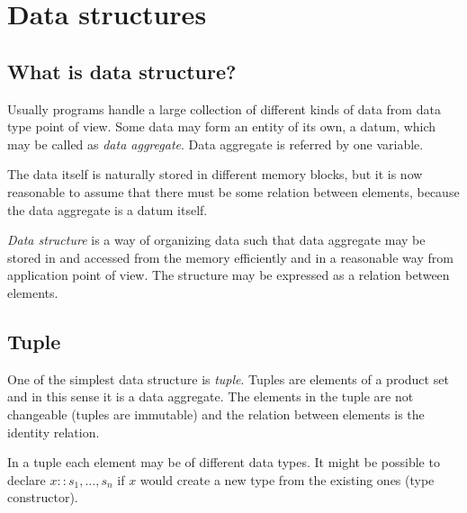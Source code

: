 \section{Data structures}
\subsection{What is data structure?}
Usually programs handle a large collection of different kinds of data from data type point of view. Some data may form an entity of its own, a datum, which may be called as \emph{data aggregate}. Data aggregate is referred by one variable.\par 
The data itself is naturally stored in different memory blocks, but it is now reasonable to assume that there must be some relation between elements, because the data aggregate is a datum itself.\par 
\emph{Data structure} is a way of organizing data such that data aggregate may be stored in and accessed from the memory efficiently and in a reasonable way from application point of view. The structure may be expressed as a relation between elements.
\subsection{Tuple} 
One of the simplest data structure is \emph{tuple}. Tuples are elements of a product set and in this sense it is a data aggregate. The elements in the tuple are not changeable (tuples are immutable) and the relation between elements is the identity relation.\par 
\note In a tuple each element may be of different data types. It might be possible to declare $x:: s_1, \dots ,s_n$ if $x$ would create a new type from the existing ones (type constructor).
